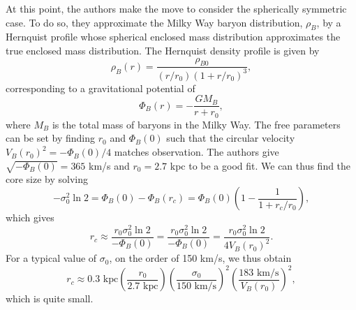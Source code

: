 At this point, the authors make the move to consider the spherically symmetric
case. To do so, they approximate the Milky Way baryon distribution, $\rho_B$, by
a Hernquist profile whose spherical enclosed mass distribution approximates
the true enclosed mass distribution. The Hernquist density profile is given by 
\begin{equation}
\rho_B(r) = \frac{\rho_{B0}}{(r/r_0) (1 + r/r_0)^3},
\end{equation}
corresponding to a gravitational potential of 
\begin{equation}
\Phi_B(r) = - \frac{G M_B}{r + r_0},
\end{equation}
where $M_B$ is the total mass of baryons in the Milky Way. The free parameters
can be set by finding $r_0$ and $\Phi_B(0)$ such that the circular velocity
$V_B(r_0)^2 = - \Phi_B(0) / 4$ matches observation. The authors give
$\sqrt{-\Phi_B(0)} = 365$ km/s and $r_0 = 2.7$ kpc to be a good fit. We can thus
find the core size by solving
\begin{equation}
-\sigma_0^2 \ln 2 = \Phi_B(0) - \Phi_B(r_c) = \Phi_B(0) \left(1 - \frac{1}{1 + r_c/r_0}\right),
\end{equation}
which gives 
\begin{equation}
r_c \approx \frac{r_0 \sigma_0^2 \ln 2}{-\Phi_B(0)} = \frac{r_0 \sigma_0^2 \ln 2}{-\Phi_B(0)} = \frac{r_0 \sigma_0^2 \ln 2}{4 V_B(r_0)^2}.
\end{equation}
For a typical value of $\sigma_0$, on the order of 150 km/s, we thus obtain 
\begin{equation}
r_c \approx 0.3 \text{ kpc} 
\left(\frac{r_0}{2.7 \text{ kpc}}\right)
\left(\frac{\sigma_0}{150 \text{ km/s}}\right)^2
\left(\frac{183 \text{ km/s}}{V_B(r_0)}\right)^2,
\end{equation}
which is quite small.

